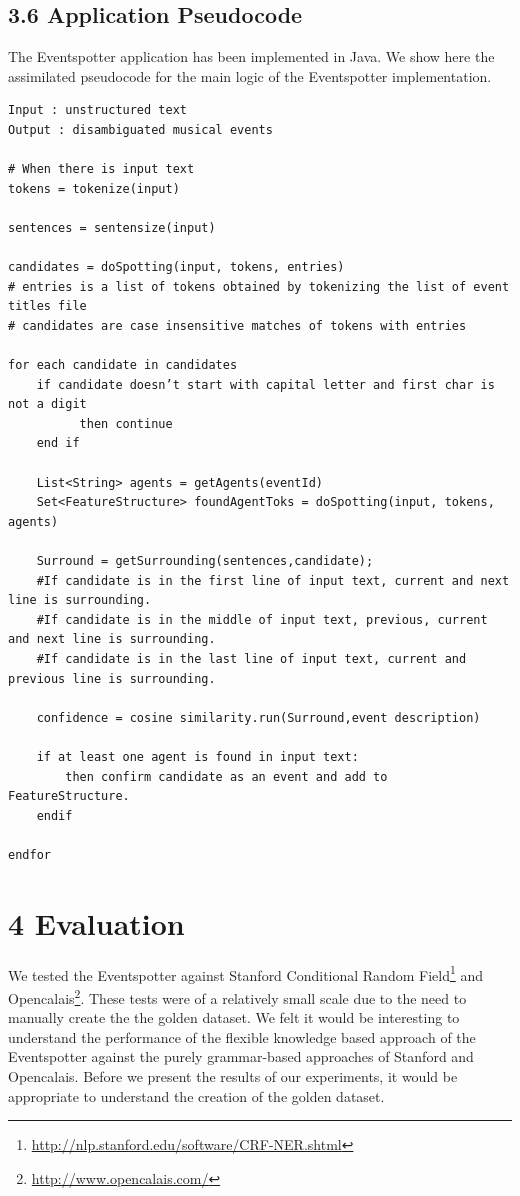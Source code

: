 \documentclass[a4paper,11pt]{report}
\begin{document}
\section*{3.6 Application Pseudocode}
The Eventspotter application has been implemented in Java. We show here the assimilated pseudocode for the main logic of the Eventspotter implementation.

\begin{lstlisting}
Input : unstructured text 
Output : disambiguated musical events

# When there is input text 
tokens = tokenize(input)

sentences = sentensize(input)

candidates = doSpotting(input, tokens, entries)
# entries is a list of tokens obtained by tokenizing the list of event titles file
# candidates are case insensitive matches of tokens with entries

for each candidate in candidates
	if candidate doesn’t start with capital letter and first char is not a digit
          then continue
	end if

    List<String> agents = getAgents(eventId)
	Set<FeatureStructure> foundAgentToks = doSpotting(input, tokens, agents)	
	
	Surround = getSurrounding(sentences,candidate);
	#If candidate is in the first line of input text, current and next line is surrounding.
	#If candidate is in the middle of input text, previous, current and next line is surrounding.
	#If candidate is in the last line of input text, current and previous line is surrounding.
	
	confidence = cosine similarity.run(Surround,event description)
	
    if at least one agent is found in input text:       
		then confirm candidate as an event and add to FeatureStructure.
	endif
	
endfor

\end{lstlisting}




\chapter*{4 Evaluation}
We tested the Eventspotter against Stanford Conditional Random Field\footnote{\url{http://nlp.stanford.edu/software/CRF-NER.shtml}} and Opencalais\footnote{\url{http://www.opencalais.com/}}. These tests were of a relatively small scale due to the need to manually create the the golden dataset. We felt it would be interesting to understand the performance of the flexible knowledge based approach of the Eventspotter against the purely grammar-based approaches of Stanford and Opencalais. Before we present the results of our experiments, it would be appropriate to understand the creation of the golden dataset.
\end{document}
